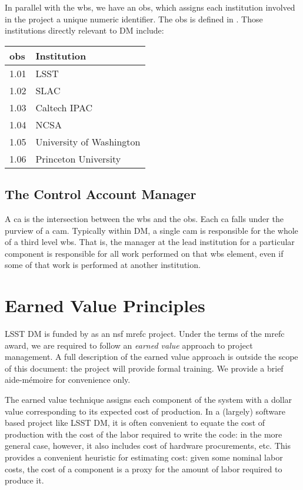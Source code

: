 In parallel with the \gls{wbs}, we have an \gls{obs}, which assigns each institution involved in the project a unique numeric identifier.
The \gls{obs} is defined in .
Those institutions directly relevant to DM include:

\begin{longtable}[]{@{}ll@{}}
\hline
\gls{obs} & Institution\tabularnewline
\hline
\endhead
1.01 & LSST\tabularnewline
1.02 & SLAC\tabularnewline
1.03 & Caltech IPAC\tabularnewline
1.04 & NCSA\tabularnewline
1.05 & University of Washington\tabularnewline
1.06 & Princeton University\tabularnewline
\hline
\end{longtable}

\subsection{The Control Account Manager}
\label{sec:cam}

A \gls{ca} is the intersection between the \gls{wbs} and the \gls{obs}.
Each \gls{ca} falls under the purview of a \gls{cam}.
Typically within DM, a single \gls{cam} is responsible for the whole of a third level \gls{wbs}.
That is, the manager at the lead institution for a particular component is responsible for all work performed on that \gls{wbs} \gls{element}, even if some of that work is performed at another institution.

\section{Earned Value Principles}
\label{sec:evms}

LSST DM is funded by as an \gls{nsf} \gls{mrefc} project.
Under the terms of the \gls{mrefc} award, we are required to follow an \emph{earned value} approach to project management.
A full description of the earned value approach is outside the scope of this document: the project will provide formal training.
We provide a brief aide-m\'emoire for convenience only.

The earned value technique assigns each component of the system with a
dollar value corresponding to its expected cost of production. In a
(largely) software based project like LSST DM, it is often convenient to
equate the cost of production with the cost of the labor required to
write the code: in the more general case, however, it also includes cost
of hardware procurements, etc. This provides a convenient heuristic for
estimating cost: given some nominal labor costs, the cost of a component
is a proxy for the amount of labor required to produce it.

